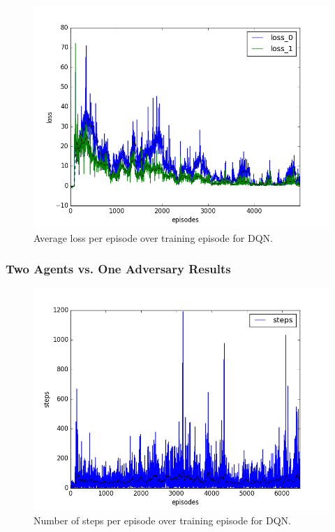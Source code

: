 \begin{figure}[h]
  \centering
  \includegraphics[trim=10 10 10 10,clip,width=\figscale\linewidth]
  {../results/dqn_1vs1/loss.png}
  \caption{Average loss per episode over training episode for DQN.}
  \label{fig:dqn-1vs1}
\end{figure}
\FloatBarrier


\subsubsection{Two Agents vs. One Adversary Results}
\label{sec:experiment:dqn:1vs2}


\begin{figure}[h]
  \centering
  \includegraphics[trim=10 10 10 10,clip,width=\figscale\linewidth]
  {../results/dqn_1vs2/steps.png}
  \caption{Number of steps per episode over training episode for DQN.}
  \label{fig:dqn-1vs2}
\end{figure}
\FloatBarrier


